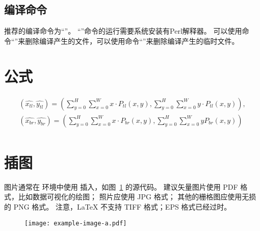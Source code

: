 \subsection{编译命令}

推荐的编译命令为``''。
``''命令的运行需要系统安装有Perl解释器。
可以使用命令``''来删除编译产生的文件，可以使用命令``''来删除编译产生的临时文件。

\section{公式}
\begin{equation} \label{eq:1}
\begin{gathered}
  (\widehat{x_{tl}} ,\widehat{y_{tl} } )=(\sum_{y=0}^{H}\sum_{x=0}^{W}x\cdot   {P_{tl}}(x,y), \sum_{y=0}^{H}\sum_{x=0}^{W}y\cdot   {P_{tl}}(x,y)),  \\
  (\widehat{x_{br}} ,\widehat{y_{br} } )=(\sum_{y=0}^{H}\sum_{x=0}^{W}x\cdot   {P_{br}}(x,y), \sum_{y=0}^{H}\sum_{x=0}^{W}y {P_{br}}(x,y))\\
\end{gathered}
\end{equation}

\section{插图}
图片通常在  环境中使用  插入，如图~\ref{fig:example} 的源代码。
建议矢量图片使用 PDF 格式，比如数据可视化的绘图；
照片应使用 JPG 格式；
其他的栅格图应使用无损的 PNG 格式。
注意，LaTeX 不支持 TIFF 格式；EPS 格式已经过时。

\begin{figure}
    \centering
    \texttt{[image: example-image-a.pdf]}

     \label{label:figxx}
    \label{fig:example}
\end{figure}
  
